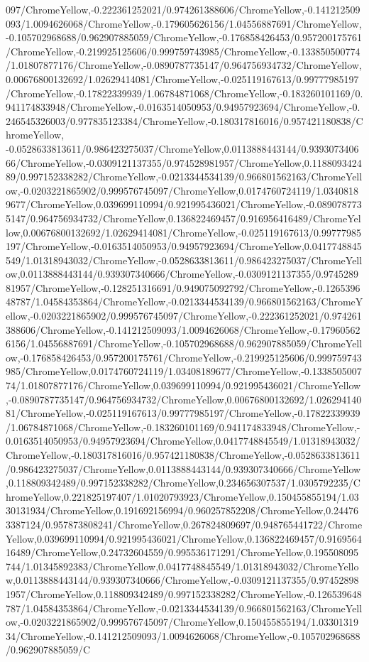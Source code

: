 {\begin{tikzternal}
{097/ChromeYellow,-0.222361252021/0.974261388606/ChromeYellow,-0.141212509093/1.0094626068/ChromeYellow,-0.179605626156/1.04556887691/ChromeYellow,-0.105702968688/0.962907885059/ChromeYellow,-0.176858426453/0.957200175761/ChromeYellow,-0.219925125606/0.999759743985/ChromeYellow,-0.133850500774/1.01807877176/ChromeYellow,-0.0890787735147/0.964756934732/ChromeYellow,0.00676800132692/1.02629414081/ChromeYellow,-0.025119167613/0.99777985197/ChromeYellow,-0.17822339939/1.06784871068/ChromeYellow,-0.183260101169/0.941174833948/ChromeYellow,-0.0163514050953/0.94957923694/ChromeYellow,-0.246545326003/0.977835123384/ChromeYellow,-0.180317816016/0.957421180838/ChromeYellow,
-0.0528633813611/0.986423275037/ChromeYellow,0.0113888443144/0.939307340666/ChromeYellow,-0.0309121137355/0.974528981957/ChromeYellow,0.118809342489/0.997152338282/ChromeYellow,-0.0213344534139/0.966801562163/ChromeYellow,-0.0203221865902/0.999576745097/ChromeYellow,0.0174760724119/1.03408189677/ChromeYellow,0.039699110994/0.921995436021/ChromeYellow,-0.0890787735147/0.964756934732/ChromeYellow,0.136822469457/0.916956416489/ChromeYellow,0.00676800132692/1.02629414081/ChromeYellow,-0.025119167613/0.99777985197/ChromeYellow,-0.0163514050953/0.94957923694/ChromeYellow,0.0417748845549/1.01318943032/ChromeYellow,-0.0528633813611/0.986423275037/ChromeYellow,0.0113888443144/0.939307340666/ChromeYellow,-0.0309121137355/0.974528981957/ChromeYellow,-0.128251316691/0.949075092792/ChromeYellow,-0.126539648787/1.04584353864/ChromeYellow,-0.0213344534139/0.966801562163/ChromeYellow,-0.0203221865902/0.999576745097/ChromeYellow,-0.222361252021/0.974261388606/ChromeYellow,-0.141212509093/1.0094626068/ChromeYellow,-0.179605626156/1.04556887691/ChromeYellow,-0.105702968688/0.962907885059/ChromeYellow,-0.176858426453/0.957200175761/ChromeYellow,-0.219925125606/0.999759743985/ChromeYellow,0.0174760724119/1.03408189677/ChromeYellow,-0.133850500774/1.01807877176/ChromeYellow,0.039699110994/0.921995436021/ChromeYellow,-0.0890787735147/0.964756934732/ChromeYellow,0.00676800132692/1.02629414081/ChromeYellow,-0.025119167613/0.99777985197/ChromeYellow,-0.17822339939/1.06784871068/ChromeYellow,-0.183260101169/0.941174833948/ChromeYellow,-0.0163514050953/0.94957923694/ChromeYellow,0.0417748845549/1.01318943032/ChromeYellow,-0.180317816016/0.957421180838/ChromeYellow,-0.0528633813611/0.986423275037/ChromeYellow,0.0113888443144/0.939307340666/ChromeYellow,0.118809342489/0.997152338282/ChromeYellow,0.234656307537/1.0305792235/ChromeYellow,0.221825197407/1.01020793923/ChromeYellow,0.150455855194/1.0330131934/ChromeYellow,0.191692156994/0.960257852208/ChromeYellow,0.244763387124/0.957873808241/ChromeYellow,0.267824809697/0.948765441722/ChromeYellow,0.039699110994/0.921995436021/ChromeYellow,0.136822469457/0.916956416489/ChromeYellow,0.24732604559/0.995536171291/ChromeYellow,0.195508095744/1.01345892383/ChromeYellow,0.0417748845549/1.01318943032/ChromeYellow,0.0113888443144/0.939307340666/ChromeYellow,-0.0309121137355/0.974528981957/ChromeYellow,0.118809342489/0.997152338282/ChromeYellow,-0.126539648787/1.04584353864/ChromeYellow,-0.0213344534139/0.966801562163/ChromeYellow,-0.0203221865902/0.999576745097/ChromeYellow,0.150455855194/1.0330131934/ChromeYellow,-0.141212509093/1.0094626068/ChromeYellow,-0.105702968688/0.962907885059/C}
\end{tikzternal}}
